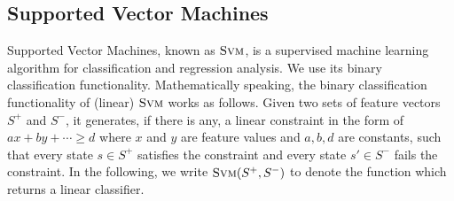\subsection{Supported Vector Machines}

Supported Vector Machines, known as $\textsc{Svm}$, is a supervised machine learning algorithm for classification and regression analysis. 
We use its binary classification functionality. 
Mathematically speaking, the binary classification functionality of (linear) $\textsc{Svm}$ works as follows. 
Given two sets of feature vectors $S^+$ and $S^-$, it generates, if there is any, 
a linear constraint in the form of $ax + by + \cdots \geq d$ where $x$ and $y$ are feature values and $a, b, d$ are constants, 
such that every state $s \in S^+$ satisfies the constraint and every state $s' \in S^-$ fails the constraint. 
In the following, we write $\textsc{Svm}(S^+, S^-)$ to denote the function which returns a linear classifier.


